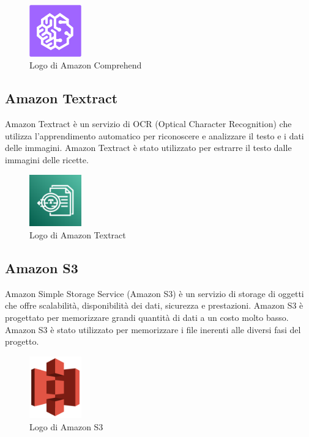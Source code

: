 \begin{figure}[h]
  \centering
  \includegraphics[width=0.2\textwidth]{img/tecnologie/comprehend.png}
  \caption{Logo di Amazon Comprehend}
  \label{fig:comprehend}
\end{figure}

\subsection{Amazon Textract}
Amazon Textract è un servizio di OCR (Optical Character Recognition) che utilizza l'apprendimento automatico per riconoscere e analizzare il testo e i dati delle immagini. Amazon Textract è stato utilizzato per estrarre il testo dalle immagini delle ricette.

\begin{figure}[h]
  \centering
  \includegraphics[width=0.2\textwidth]{img/tecnologie/textract.png}
  \caption{Logo di Amazon Textract}
  \label{fig:textract}
\end{figure}

\subsection{Amazon S3}
Amazon Simple Storage Service (Amazon S3) è un servizio di storage di oggetti che offre scalabilità, disponibilità dei dati, sicurezza e prestazioni. Amazon S3 è progettato per memorizzare grandi quantità di dati a un costo molto basso. Amazon S3 è stato utilizzato per memorizzare i file inerenti alle diversi fasi del progetto.

\begin{figure}[h]
  \centering
  \includegraphics[width=0.2\textwidth]{img/tecnologie/s3.png}
  \caption{Logo di Amazon S3}
  \label{fig:s3}
\end{figure}

